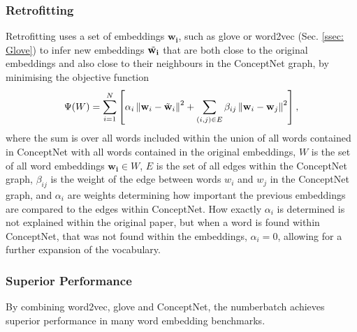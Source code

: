         \subsubsection{Retrofitting}
            Retrofitting uses a set of \glspl{embedding} $\mathbf{w_i}$, such as \gls{glove} or word2vec (Sec. \ref{ssec: Glove}) to infer new \glspl{embedding} $\Tilde{\mathbf{w_i}}$ that are both close to the original \glspl{embedding} and also close to their neighbours in the ConceptNet graph, by minimising the objective function 
            \begin{equation}
                \Psi(W)=\sum_{i=1}^{N}\left[\alpha_{i}\left\|\mathbf{w}_{i}-\Tilde{\mathbf{w}}_{i}\right\|^{2}+\sum_{(i, j) \in E} \beta_{i j}\left\|\mathbf{w}_{i}-\mathbf{w}_{j}\right\|^{2}\right],
            \end{equation}
            where the sum is over all words included within the union of all words contained in ConceptNet with all words contained in the original \glspl{embedding}, $W$ is the set of all word \glspl{embedding} $\mathbf{w_i} \in W$, $E$ is the set of all edges within the ConceptNet graph, $\beta_{ij}$ is the weight of the edge between words $w_i$ and $w_j$ in the ConceptNet graph, and $\alpha_i$ are weights determining how important the previous \glspl{embedding} are compared to the edges within ConceptNet. How exactly $\alpha_i$ is determined is not explained within the original paper, but when a word is found within ConceptNet, that was not found within the \glspl{embedding}, $\alpha_i = 0$, allowing for a further expansion of the vocabulary.\cite{speer2017conceptnet}
        
        \subsubsection{Superior Performance}
            By combining word2vec, \gls{glove} and ConceptNet, the \gls{numberbatch} achieves superior performance in many word embedding benchmarks\cite{speer2017conceptnet, conceptnetPerformance}.
        
        
